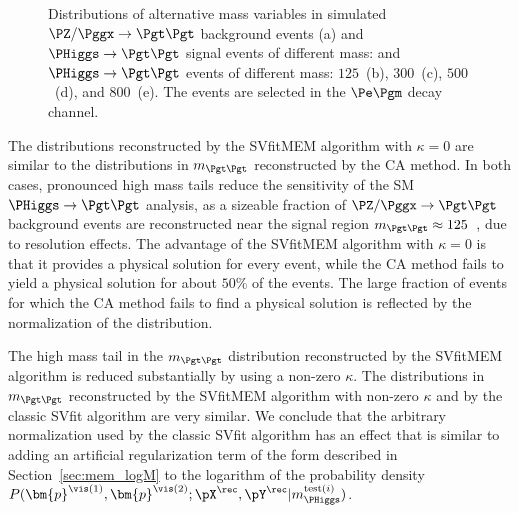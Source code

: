 \begin{figure}
\begin{center}
\end{center}
\caption{
  Distributions of alternative mass variables in simulated $\PZ/\Pggx \to \Pgt\Pgt$ background events (a) 
  and $\PHiggs \to \Pgt\Pgt$ signal events of different mass:
  and $\PHiggs \to \Pgt\Pgt$ events of different mass:
  $125$~\GeV (b), $300$~\GeV (c), $500$~\GeV (d), and $800$~\GeV (e).
  The events are selected in the $\Pe\Pgm$ decay channel.
}
\label{fig:massDistributions_emu}
\end{figure}

The distributions reconstructed by the SVfitMEM algorithm with $\kappa = 0$ are similar to the distributions in $m_{\Pgt\Pgt}$ reconstructed by the CA method.
In both cases, pronounced high mass tails reduce the sensitivity of the SM $\PHiggs \to \Pgt\Pgt$ analysis,
as a sizeable fraction of $\PZ/\Pggx \to \Pgt\Pgt$ background events
are reconstructed near the signal region $m_{\Pgt\Pgt} \approx 125$~\GeV, due to resolution effects.
The advantage of the SVfitMEM algorithm with $\kappa =
0$ is that it provides a physical solution for every event,
while the CA method fails to yield a physical solution for about $50\%$ of the events.
The large fraction of events for which the CA method fails to find a physical solution is reflected by the normalization of the distribution.

The high mass tail in the $m_{\Pgt\Pgt}$ distribution reconstructed by
the SVfitMEM algorithm is reduced substantially by using
a non-zero $\kappa$.
The distributions in $m_{\Pgt\Pgt}$ reconstructed by the SVfitMEM
algorithm with non-zero $\kappa$ and by the classic SVfit algorithm are
very similar.
We conclude that the arbitrary normalization used by the classic SVfit
algorithm has an effect that is similar to adding 
an artificial regularization term of the form described in Section~\ref{sec:mem_logM}
to the logarithm of the probability density 
$P(\bm{p}^{\vis(1)},\bm{p}^{\vis(2)};\pX^{\rec},\pY^{\rec}|m_{\PHiggs}^{\textrm{test}(i)})$.

